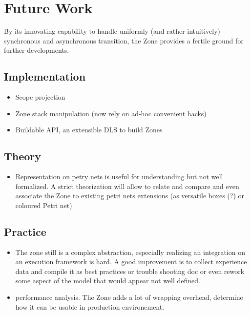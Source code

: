 
\chapter{Future Work}

By its innovating capability to handle uniformly (and rather intuitively) synchronous and asynchronous transition, the Zone provides a fertile ground for further developments.

\section{Implementation}

\begin{itemize}
\item Scope projection
\item Zone stack manipulation (now rely on ad-hoc convenient hacks)
\item Buildable API, an extensible DLS to build Zones
\end{itemize}

\section{Theory}

\begin{itemize}
\item Representation on petry nets is useful for understanding but not well formalized. A strict theorization will allow to relate and compare and even associate the Zone to existing petri nets extensions (as versatile boxes (?) or coloured Petri net)
\end{itemize}

\section{Practice}

\begin{itemize}
\item The zone still is a complex abstraction, especially realizing an integration on an execution framework is hard. A good improvement is to collect experience data and compile it as best practices or trouble shooting doc or even rework some aspect of the model that would appear not well defined.
\item performance analysis. The Zone adds a lot of wrapping overhead, determine how it can be usable in production environement.
\end{itemize}
